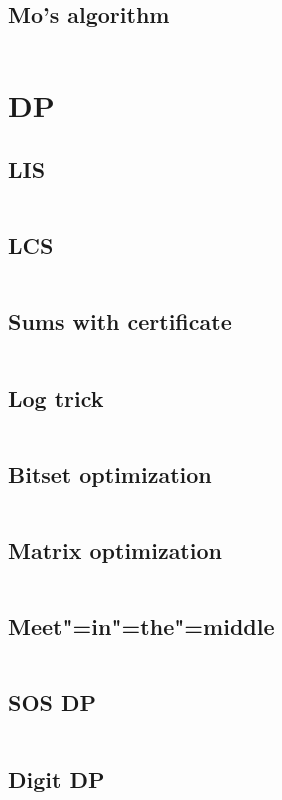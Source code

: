 ﻿\documentclass[10pt,twocolumn,oneside]{article}
\begin{document}
\subsection{Mo's algorithm}
\inputminted[breaklines]{cpp}{SQRT heuristics/mo's algorithm.cpp}

\section{DP}
\subsection{LIS}
\inputminted[breaklines]{cpp}{DP/lis.cpp}
\subsection{LCS}
\inputminted[breaklines]{python}{DP/lcs.py}
\subsection{Sums with certificate}
\inputminted[breaklines]{python}{DP/sums with certificate.py}
\subsection{Log trick}
\inputminted[breaklines]{cpp}{DP/log-trick.cpp}
\subsection{Bitset optimization}
\inputminted[breaklines]{cpp}{DP/bitset optimization.cpp}
\subsection{Matrix optimization}
\inputminted[breaklines]{cpp}{DP/matrix optimization.cpp}
\subsection{Meet"=in"=the"=middle}
\inputminted[breaklines]{cpp}{DP/meet-in-the-middle.cpp}
\subsection{SOS DP}
\inputminted[breaklines]{cpp}{DP/sos-dp.cpp}
\subsection{Digit DP}
\inputminted[breaklines]{cpp}{DP/digit dp.cpp}
\end{document}
